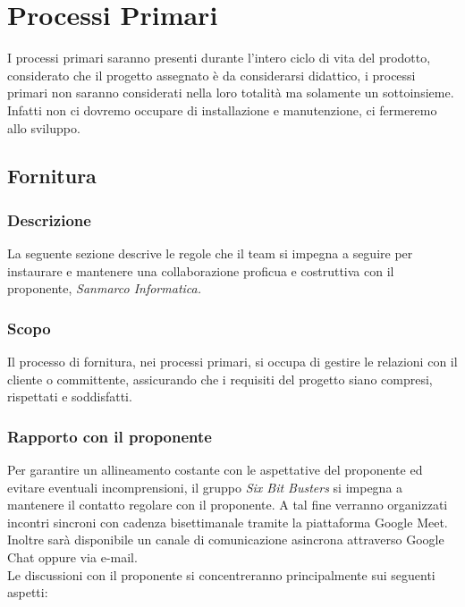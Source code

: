 \section{Processi Primari}
I processi primari saranno presenti durante l'intero ciclo di vita del prodotto, 
considerato che il progetto assegnato è da considerarsi didattico, i processi 
primari non saranno considerati nella loro totalità ma solamente un sottoinsieme.\\
Infatti non ci dovremo occupare di installazione e manutenzione, ci fermeremo allo sviluppo.

    \subsection{Fornitura}
        \subsubsection{Descrizione}
        La seguente sezione descrive le regole che il team si impegna a seguire 
        per instaurare e mantenere una collaborazione proficua e costruttiva con il proponente, 
        \textit{Sanmarco Informatica.}

        \subsubsection{Scopo}
        Il processo di fornitura, nei processi primari, si occupa di gestire le relazioni 
        con il cliente o committente, assicurando che i requisiti del progetto siano 
        compresi, rispettati e soddisfatti.

        \subsubsection{Rapporto con il proponente}
        Per garantire un allineamento costante con le aspettative del proponente ed evitare eventuali incomprensioni,
        il gruppo \textit{Six Bit Busters} si impegna a mantenere il contatto regolare con il proponente.
        A tal fine verranno organizzati incontri sincroni con cadenza bisettimanale tramite la piattaforma Google Meet. 
        Inoltre sarà disponibile un canale di comunicazione asincrona attraverso Google Chat oppure via e-mail.\\
        
        Le discussioni con il proponente si concentreranno principalmente sui seguenti aspetti:
        
